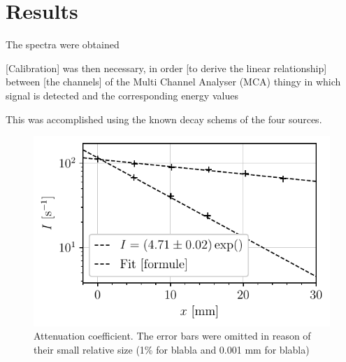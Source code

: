 \section{Results}
The spectra were obtained

[Calibration] was then necessary,
in order [to derive the linear relationship] between [the channels] of the Multi Channel Analyser (MCA) thingy in which signal is detected 
and the corresponding energy values

This was accomplished using the known decay schems of the four sources.

\begin{figure}[h]
    \centering
    \includegraphics[scale=1]{figures/attenuation_coefficient.pdf}
    \caption{Attenuation coefficient. The error bars were omitted in reason of their small relative size (1\% for blabla and 0.001 mm for blabla)}
    \label{fig:attenuation_coefficient}
\end{figure}